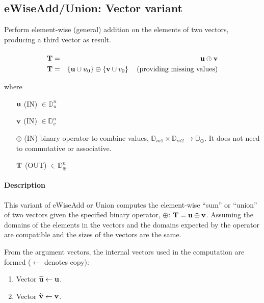 \subsection{{\sf eWiseAdd/Union}: Vector variant}

Perform element-wise (general) addition on the elements of two vectors,
producing a third vector as result.

\paragraph{\syntax}

\begin{eqnarray*}
{\bf T} & = & {\bf u} \oplus {\bf v} \\
{\bf T} & = & \left\{ {\bf u}\cup u_0 \right\} \oplus \left\{ {\bf v} \cup v_0 \right\}  \mbox{~~~(providing missing values)}
\end{eqnarray*}

where

\begin{itemize}[leftmargin=1.1in]
    \item[${\bf u}$]    ({\sf IN}) $\in \mathbb{D}_{u}^{n}$

    \item[${\bf v}$]    ({\sf IN}) $\in \mathbb{D}_{v}^{n}$

    \item[$\oplus$]   ({\sf IN}) binary operator to combine values, $\mathbb{D}_{in1} \times \mathbb{D}_{in2} \rightarrow \mathbb{D}_\oplus$.  It does not need to commutative or associative.

    \item[${\bf T}$]    ({\sf OUT}) $\in \mathbb{D}_\oplus^{n}$

\end{itemize}

\paragraph{Description}

This variant of {\sf eWiseAdd} or {\sf Union} computes the element-wise ``sum'' or
``union'' of two vectors given the specified binary operator, $\oplus$: 
${\bf T} = {\bf u} \oplus {\bf v}$.  Assuming the domains of the
elements in the vectors and the domains expected by the operator are compatible
and the sizes of the vectors are the same.

From the argument vectors, the internal vectors used in 
the computation are formed ($\leftarrow$ denotes copy):
\begin{enumerate}
	\item Vector ${\bf \widetilde{u}} \leftarrow {\bf u}$.

	\item Vector ${\bf \widetilde{v}} \leftarrow {\bf v}$.
\end{enumerate}

